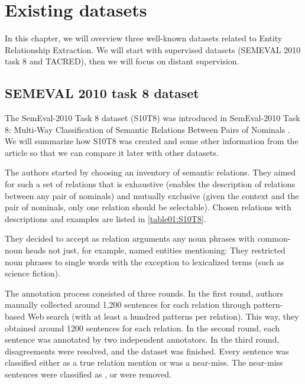 \chapter{Existing datasets}
\label{chap:datasets}

In this chapter, we will overview three well-known datasets related to Entity Relationship Extraction. We will start with supervised datasets (SEMEVAL 2010 task 8 and TACRED), then we will focus on distant supervision.


\section{SEMEVAL 2010 task 8 dataset}
The SemEval-2010 Task 8 dataset (S10T8) was introduced in SemEval-2010 Task 8: Multi-Way Classification of Semantic Relations Between Pairs of Nominals \cite{semeval}. We will summarize how S10T8 was created and some other information from the article so that we can compare it later with other datasets.

The authors started by choosing an inventory of semantic relations. They aimed for such a set of relations that is exhaustive (enables the description of relations between any pair of nominals) and mutually exclusive (given the context and the pair of nominals, only one relation should be selectable).  Chosen relations with descriptions and examples are listed in \autoref{table01:S10T8}. 


They decided to accept as relation arguments any noun phrases with common-noun heads not just, for example, named entities mentioning:     They restricted noun phrases to single words with the exception to lexicalized terms (such as  science fiction).

The annotation process consisted of three rounds. In the first round, authors manually collected around 1,200 sentences for each relation through pattern-based Web search (with at least a hundred patterns per relation). This way, they obtained around 1200 sentences for each relation. In the second round, each sentence was annotated by two independent annotators. In the third round, disagreements were resolved, and the dataset was finished. Every sentence was classified either as a true relation mention or was a  near-miss. The near-miss sentences were classified as , or were removed.

